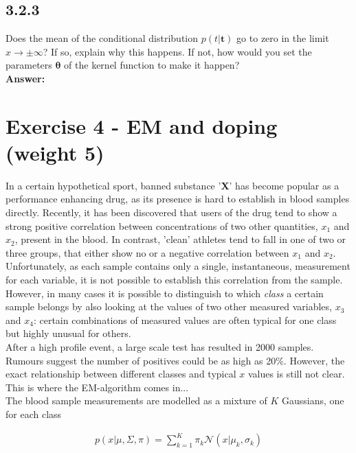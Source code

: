 \documentclass[a4paper]{article}
\begin{document}
\subsection*{3.2.3}

Does the mean of the conditional distribution $p(t | \textbf{t})$ go to zero in the limit $x \to \pm \infty$? If so, explain why this happens. If not, how would you set the parameters $\boldsymbol{\theta}$ of the kernel function to make it happen?\\

\textbf{Answer:}\\

 


\section*{Exercise 4 - EM and doping (weight 5)}

In a certain hypothetical sport, banned substance '\textbf{X}' has become popular as a performance enhancing drug, as its presence is hard to establish in blood samples directly. Recently, it has been discovered that users of the drug tend to show a strong positive correlation between concentrations of two other quantities, $x_1$ and $x_2$, present in the blood. In contrast, 'clean' athletes tend to fall in one of two or three groups, that either show no or a negative correlation between $x_1$ and $x_2$. Unfortunately, as each sample contains only a single, instantaneous, measurement for each variable, it is not possible to establish this correlation from the sample. However, in many cases it is possible to distinguish to which \textit{class} a certain sample belongs by also looking at the values of two other measured variables, $x_3$ and $x_4$: certain combinations of measured values are often typical for one class but highly unusual for others.\\
After a high profile event, a large scale test has resulted in 2000 samples. Rumours suggest the number of positives could be as high as 20\%. However, the exact relationship between different classes and typical $x$ values is still not clear. This is where the EM-algorithm comes in...\\

The blood sample measurements are modelled as a mixture of $K$ Gaussians, one for each class

\begin{eqnarray} \label{eq:7}
p(x | \mu, \Sigma, \pi) = \sum^K_{k = 1} \pi_k \mathcal{N}(x | \mu_k, \sigma_k)
\end{eqnarray}
\end{document}
